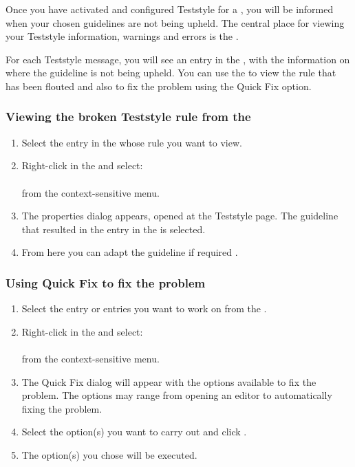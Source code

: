 Once you have activated  and configured  Teststyle for a \gdproject{}, you will be informed when your chosen guidelines are not being upheld. The central place for viewing your Teststyle information, warnings and errors is the \gdprobview{}.

For each Teststyle message, you will see an entry in the \gdprobview{}, with the information on where the guideline is not being upheld. You can use the \gdprobview{} to view the rule that has been flouted and also to fix the problem using the Quick Fix option. 

\subsubsection{Viewing the broken Teststyle rule from the \gdprobview{}}
\begin{enumerate}
\item Select the entry in the \gdprobview{} whose rule you want to view.
\item Right-click in the \gdprobview{} and select:\\
\\
from the context-sensitive menu.
\item The \gdproject{} properties dialog appears, opened at the Teststyle page. The guideline that resulted in the entry in the \gdprobview{} is selected. 
\item From here you can adapt the guideline if required . 
\end{enumerate}

\subsubsection{Using Quick Fix to fix the problem}

\begin{enumerate}
\item Select the entry or entries you want to work on from the \gdprobview{}.
\item Right-click in the \gdprobview{} and select:\\
\\
from the context-sensitive menu.
\item The Quick Fix dialog  will appear with the options available to fix the problem. The options may range from opening an editor to automatically fixing the problem.
\item Select the option(s) you want to carry out and click .
\item The option(s) you chose will be executed. 
\end{enumerate}

